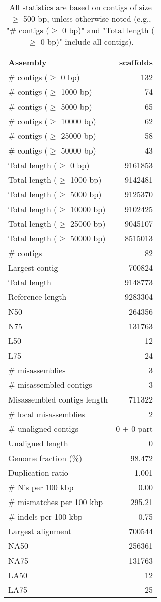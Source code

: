 \documentclass[12pt,a4paper]{article}
\begin{document}
\begin{table}[ht]
\begin{center}
\caption{All statistics are based on contigs of size $\geq$ 500 bp, unless otherwise noted (e.g., "\# contigs ($\geq$ 0 bp)" and "Total length ($\geq$ 0 bp)" include all contigs).}
\begin{tabular}{|l*{1}{|r}|}
\hline
Assembly & scaffolds \\ \hline
\# contigs ($\geq$ 0 bp) & 132 \\ \hline
\# contigs ($\geq$ 1000 bp) & 74 \\ \hline
\# contigs ($\geq$ 5000 bp) & 65 \\ \hline
\# contigs ($\geq$ 10000 bp) & 62 \\ \hline
\# contigs ($\geq$ 25000 bp) & 58 \\ \hline
\# contigs ($\geq$ 50000 bp) & 43 \\ \hline
Total length ($\geq$ 0 bp) & 9161853 \\ \hline
Total length ($\geq$ 1000 bp) & 9142481 \\ \hline
Total length ($\geq$ 5000 bp) & 9125370 \\ \hline
Total length ($\geq$ 10000 bp) & 9102425 \\ \hline
Total length ($\geq$ 25000 bp) & 9045107 \\ \hline
Total length ($\geq$ 50000 bp) & 8515013 \\ \hline
\# contigs & 82 \\ \hline
Largest contig & 700824 \\ \hline
Total length & 9148773 \\ \hline
Reference length & 9283304 \\ \hline
N50 & 264356 \\ \hline
N75 & 131763 \\ \hline
L50 & 12 \\ \hline
L75 & 24 \\ \hline
\# misassemblies & 3 \\ \hline
\# misassembled contigs & 3 \\ \hline
Misassembled contigs length & 711322 \\ \hline
\# local misassemblies & 2 \\ \hline
\# unaligned contigs & 0 + 0 part \\ \hline
Unaligned length & 0 \\ \hline
Genome fraction (\%) & 98.472 \\ \hline
Duplication ratio & 1.001 \\ \hline
\# N's per 100 kbp & 0.00 \\ \hline
\# mismatches per 100 kbp & 295.21 \\ \hline
\# indels per 100 kbp & 0.75 \\ \hline
Largest alignment & 700544 \\ \hline
NA50 & 256361 \\ \hline
NA75 & 131763 \\ \hline
LA50 & 12 \\ \hline
LA75 & 25 \\ \hline
\end{tabular}
\end{center}
\end{table}
\end{document}
